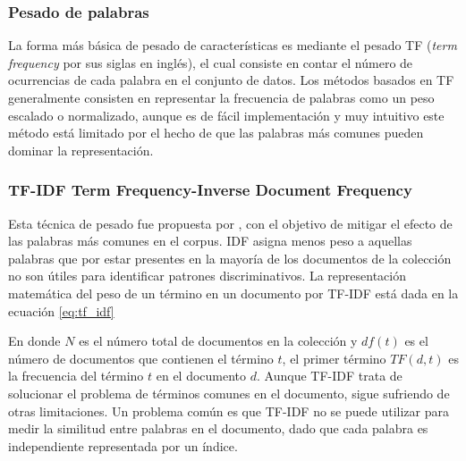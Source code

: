

\subsubsection{Pesado de palabras}La forma más básica de pesado de características es mediante el pesado TF (\textit{term frequency} por sus siglas en inglés), el cual consiste en contar el número de ocurrencias de cada palabra en el conjunto de datos. Los métodos basados en TF generalmente consisten en representar la frecuencia de palabras como un peso escalado o normalizado, aunque es de fácil implementación y muy intuitivo este método está limitado por el hecho de que las palabras más comunes pueden dominar la representación.

\subsubsection{TF-IDF Term Frequency-Inverse Document Frequency} Esta técnica de  pesado fue propuesta por \citep{jones1972statistical}, con el objetivo de mitigar el efecto de las palabras más comunes en el corpus. IDF asigna menos peso a aquellas palabras que por estar presentes en la mayoría de los documentos de la colección no son útiles para identificar patrones discriminativos. La representación matemática del peso de un término en un documento por TF-IDF está dada en la ecuación \ref{eq:tf_idf}



En donde $N$ es el número total de documentos en la colección y $df(t)$ es el número de documentos que contienen el término $t$, el primer término $TF(d,t)$ es la frecuencia del término $t$ en el documento $d$. Aunque TF-IDF trata de solucionar el problema de términos comunes en el documento, sigue sufriendo de otras limitaciones. Un problema común es que TF-IDF no se puede utilizar para medir la similitud entre palabras en el documento, dado que cada palabra es independiente representada por un índice.

